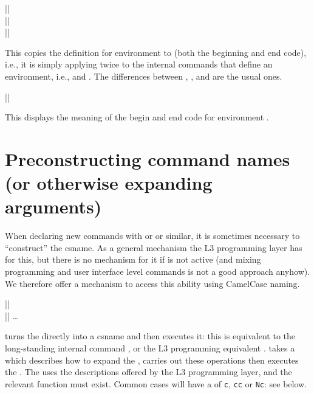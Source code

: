 \documentclass{ltxguide}
\begin{document}
\begin{decl}
  |\NewEnvironmentCopy|         \\
  |\RenewEnvironmentCopy|       \\
  |\DeclareEnvironmentCopy|    
\end{decl}

This copies the definition for environment  to
 (both the beginning and end code), i.e., it is simply
applying  twice to the internal commands that
define an environment, i.e., \cs{} and .
The differences between , , and
 are the usual ones.

\begin{decl}
  |\ShowEnvironment|       
\end{decl}
This displays the meaning of the begin and end code for environment .




\section[Preconstructing command names \\ (or otherwise expanding arguments)]
        {Preconstructing command names (or otherwise expanding arguments)}
\label{sec:preconstructing-csnames}

When declaring new commands with  or
 or similar, it is sometimes necessary to
``construct'' the csname. As a general mechanism the L3 programming
layer has  for this, but there is no mechanism for
it if  is not active (and mixing programming and user
interface level commands is not a good approach anyhow). We therefore
offer a mechanism to access this ability using CamelCase naming.

\begin{decl}
  |\UseName|   \\
  |\ExpandArgs|    \dots
\end{decl}

 turns the  directly into a csname and
then executes it: this is equivalent to the long-standing
\LaTeXe{} internal command , or the L3 programming
equivalent .  takes a  which
describes how to expand the , carries out these
operations then executes the . The  uses
the descriptions offered by the L3 programming layer, and the
relevant  function must exist. Common cases will
have a  of \texttt{c}, \texttt{cc} or \texttt{Nc}: see below.
\end{document}
